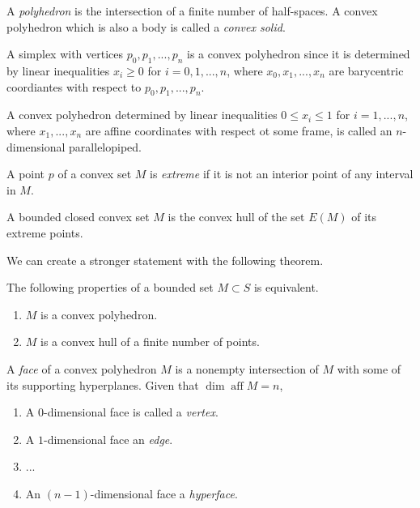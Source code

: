 \documentclass{article}
\DeclareMathOperator{\aff}{aff}
\begin{document}
    \begin{definition}
    A \textit{polyhedron} is the intersection of a finite number of half-spaces. A convex polyhedron which is also a body is called a \textit{convex solid}. 
    \end{definition}

    \begin{example}
    A simplex with vertices $p_0, p_1, ..., p_n$ is a convex polyhedron since it is determined by linear inequalities $x_i \geq 0$ for $i = 0, 1, ..., n$, where $x_0, x_1, ..., x_n$ are barycentric coordiantes with respect to $p_0, p_1,..., p_n$. 
    \end{example}

    \begin{example}
    A convex polyhedron determined by linear inequalities $0 \leq x_i \leq 1$ for $i = 1, ..., n$, where $x_1,..., x_n$ are affine coordinates with respect ot some frame, is called an $n$-dimensional parallelopiped. 
    \end{example}

    \begin{definition}
    A point $p$ of a convex set $M$ is \textit{extreme} if it is not an interior point of any interval in $M$. 
    \end{definition}

    \begin{theorem}
    A bounded closed convex set $M$ is the convex hull of the set $E(M)$ of its extreme points. 
    \end{theorem}

    We can create a stronger statement with the following theorem. 

    \begin{theorem}
    The following properties of a bounded set $M \subset S$ is equivalent.
    \begin{enumerate}
        \item $M$ is a convex polyhedron. 
        \item $M$ is a convex hull of a finite number of points. 
    \end{enumerate}
    \end{theorem}

    \begin{definition}
    A \textit{face} of a convex polyhedron $M$ is a nonempty intersection of $M$ with some of its supporting hyperplanes. Given that $\dim \aff M = n$, 
    \begin{enumerate}
        \item A $0$-dimensional face is called a \textit{vertex}. 
        \item A $1$-dimensional face an \textit{edge}. 
        \item ...
        \item An $(n-1)$-dimensional face a \textit{hyperface}. 
    \end{enumerate}
    \end{definition}
\end{document}
